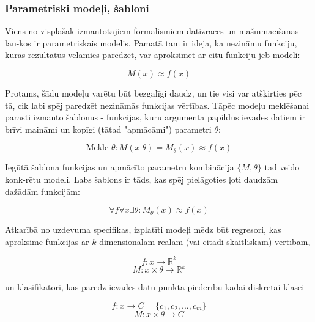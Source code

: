 \documentclass[12pt, a4paper]{article}
\numberwithin{equation}{section} %
\begin{document}
\subsubsection{Parametriski modeļi, šabloni}

Viens no visplašāk izmantotajiem formālismiem datizraces un mašīnmācīšanās lau-kos ir parametriskais modelis. Pamatā tam ir ideja, ka nezināmu funkciju, kuras rezultātus vēlamies paredzēt, var aproksimēt ar citu funkciju jeb modeli:

\begin{equation} 
    M(x) \approx f(x)
\end{equation}

Protams, šādu modeļu varētu būt bezgalīgi daudz, un tie visi var atšķirties pēc tā, cik labi spēj paredzēt nezināmās funkcijas vērtības. Tāpēc modeļu meklēšanai parasti izmanto šablonus - funkcijas, kuru argumentā papildus ievades datiem ir brīvi maināmi un kopīgi (tātad "apmācāmi") parametri $\theta$:

\begin{equation} 
    \text{Meklē } \theta:M(x \vert \theta) = M_{\theta}(x)  \approx f(x)
\end{equation}

Iegūtā šablona funkcijas un apmācīto parametru kombinācija $\lbrace M, \theta \rbrace$ tad veido konk-rētu modeli. Labs šablons ir tāds, kas spēj pielāgoties ļoti daudzām dažādām funkcijām:

\begin{equation} 
    \forall f \forall x \exists \theta:M_{\theta}(x)\approx f(x)
\end{equation}

Atkarībā no uzdevuma specifikas, izplatīti modeļi mēdz būt regresori, kas aproksimē funkcijas ar $k$-dimensionālām reālām (vai citādi skaitliskām) vērtībām,

\begin{equation} 
    f:x \rightarrow \mathbb{R}^k
\end{equation}
\begin{equation} 
    M: x \times \theta \rightarrow \mathbb{R}^k
\end{equation}

un klasifikatori, kas paredz ievades datu punkta piederību kādai diskrētai klasei

\begin{equation} 
    f:x \rightarrow C = \lbrace c_1, c_2, ..., c_m \rbrace
\end{equation}
\begin{equation} 
     M: x \times \theta \rightarrow C
\end{equation}
\end{document}
